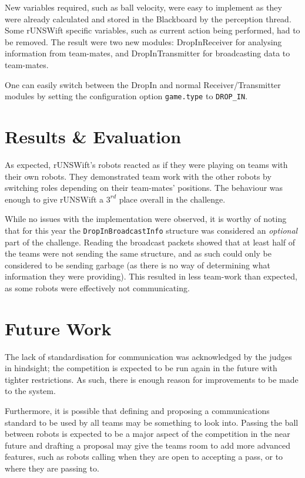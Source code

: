 New variables required, such as ball velocity, were easy to implement as they were already calculated and stored in the Blackboard by the perception thread. Some rUNSWift specific variables, such as current action being performed, had to be removed. The result were two new modules: DropInReceiver for analysing information from team-mates, and DropInTransmitter for broadcasting data to team-mates.

One can easily switch between the DropIn and normal Receiver/Transmitter modules by setting the configuration option \texttt{game.type} to \texttt{DROP\_IN}.

\section{Results \& Evaluation}

As expected, rUNSWift's robots reacted as if they were playing on teams with their own robots. They demonstrated team work with the other robots by switching roles depending on their team-mates' positions. The behaviour was enough to give rUNSWift a $3^{rd}$ place overall in the challenge.

While no issues with the implementation were observed, it is worthy of noting that for this year the \texttt{DropInBroadcastInfo} structure was considered an \textit{optional} part of the challenge. Reading the broadcast packets showed that at least half of the teams were not sending the same structure, and as such could only be considered to be sending garbage (as there is no way of determining what information they were providing). This resulted in less team-work than expected, as some robots were effectively not communicating. 

\section{Future Work}

The lack of standardisation for communication was acknowledged by the judges in hindsight; the competition is expected to be run again in the future with tighter restrictions. As such, there is enough reason for improvements to be made to the system.

Furthermore, it is possible that defining and proposing a communications standard to be used by all teams may be something to look into. Passing the ball between robots is expected to be a major aspect of the competition in the near future and drafting a proposal may give the teams room to add more advanced features, such as robots calling when they are open to accepting a pass, or to where they are passing to.
